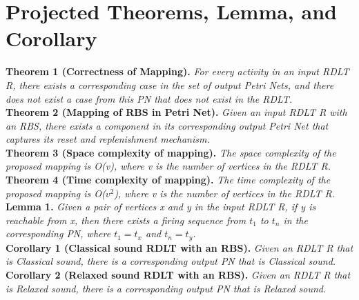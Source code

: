 \section{Projected Theorems, Lemma, and Corollary}
    \textbf{Theorem 1 (Correctness of Mapping).} \textit{For every activity in an input RDLT R, there exists a corresponding case in the set of output Petri Nets, and there does not exist a case from this PN that does not exist in the RDLT.} \\

    \noindent \textbf{Theorem 2 (Mapping of RBS in Petri Net).} \textit{Given an input RDLT R with an RBS, there exists a component in its corresponding output Petri Net that captures its reset and replenishment mechanism.} \\

    \noindent \textbf{Theorem 3 (Space complexity of mapping).} \textit{The space complexity of the proposed mapping is O(v), where v is the number of vertices in the RDLT R.} \\

    \noindent \textbf{Theorem 4 (Time complexity of mapping).} \textit{The time complexity of the proposed mapping is O($v^2$), where v is the number of vertices in the RDLT R.} \\

    \textbf{Lemma 1.} \textit{Given a pair of vertices x and y in the input RDLT R, if y is reachable from x, then there exists a firing sequence from $t_{1}$ to $t_{n}$ in the corresponding PN, where $t_{1} = t_{x}$ and $t_{n} = t_{y}$.} \\

    \textbf{Corollary 1 (Classical sound RDLT with an RBS).} \textit{Given an RDLT R that is Classical sound, there is a corresponding output PN that is Classical sound.} \\

    \textbf{Corollary 2 (Relaxed sound RDLT with an RBS).} \textit{Given an RDLT R that is Relaxed sound, there is a corresponding output PN that is Relaxed sound.}